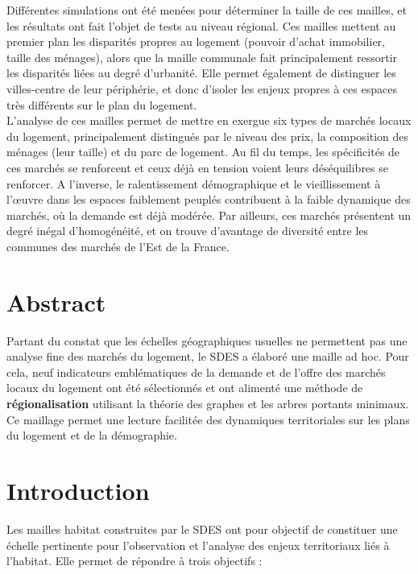 \documentclass[12pt, a4paper]{article}
\begin{document}
Différentes simulations ont été menées pour déterminer la taille de ces mailles, et les résultats ont fait l'objet de tests au niveau régional. Ces mailles mettent au premier plan les disparités propres au logement (pouvoir d'achat immobilier, taille des ménages), alors que la maille communale fait principalement ressortir les disparités liées au degré d'urbanité. Elle permet également de distinguer les villes-centre de leur périphérie, et donc d'isoler les enjeux propres à ces espaces très différents sur le plan du logement. \\

L'analyse de ces mailles permet de mettre en exergue six types de marchés locaux du logement, principalement distingués par le niveau des prix, la composition des ménages (leur taille) et du parc de logement. Au fil du temps, les spécificités de ces marchés se renforcent et ceux déjà en tension voient leurs déséquilibres se renforcer. A l'inverse, le ralentissement démographique et le vieillissement à l'\oe uvre dans les espaces faiblement peuplés contribuent à la faible dynamique des marchés, où la demande est déjà modérée. Par ailleurs, ces marchés présentent un degré inégal d'homogénéité, et on trouve d'avantage de diversité entre les communes des marchés de l'Est de la France.

\section*{Abstract}

Partant du constat que les échelles géographiques usuelles ne permettent pas une analyse fine des marchés du logement, le SDES a élaboré une maille ad hoc. Pour cela, neuf indicateurs emblématiques de la demande et de l'offre des marchés locaux du logement ont été sélectionnés et ont alimenté une méthode de \textbf{régionalisation} utilisant la théorie des graphes et les arbres portants minimaux. Ce maillage permet une lecture facilitée des dynamiques territoriales sur les plans du logement et de la démographie.


\section*{Introduction}

Les mailles habitat construites par le SDES ont pour objectif de constituer une échelle pertinente pour l'observation et l'analyse des enjeux territoriaux liés à l'habitat. Elle permet de répondre à trois objectifs :
\end{document}
